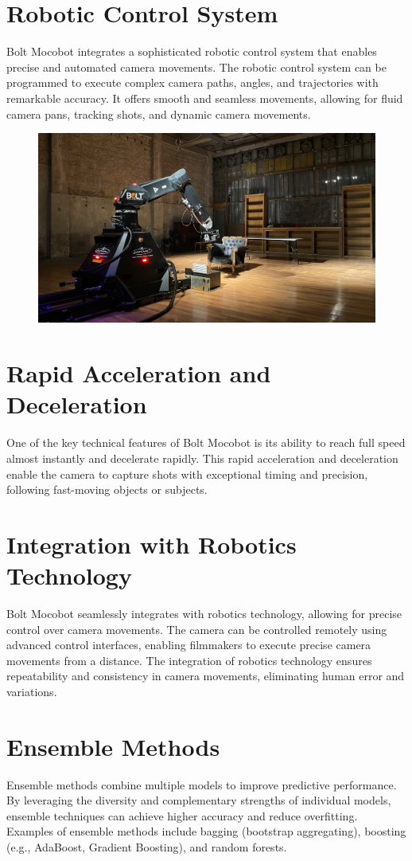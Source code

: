 \documentclass[a4paper,11pt]{report}
\begin{document}
\section{Robotic Control System}
Bolt Mocobot integrates a sophisticated robotic control system that enables precise and automated camera movements.
The robotic control system can be programmed to execute complex camera paths, angles, and trajectories with remarkable accuracy.
It offers smooth and seamless movements, allowing for fluid camera pans, tracking shots, and dynamic camera movements.
\begin{figure}[h]
	\centering
	\hspace{21pt}
	\includegraphics[width=.70\linewidth]{bolt1.jpeg}
	\label{fig:logo.png}
\end{figure}

\section{Rapid Acceleration and Deceleration}
One of the key technical features of Bolt Mocobot is its ability to reach full speed almost instantly and decelerate rapidly.
This rapid acceleration and deceleration enable the camera to capture shots with exceptional timing and precision, following fast-moving objects or subjects.

\section{Integration with Robotics Technology}
Bolt Mocobot seamlessly integrates with robotics technology, allowing for precise control over camera movements.
The camera can be controlled remotely using advanced control interfaces, enabling filmmakers to execute precise camera movements from a distance.
The integration of robotics technology ensures repeatability and consistency in camera movements, eliminating human error and variations.

\section{Ensemble Methods}
Ensemble methods combine multiple models to improve predictive performance. By leveraging the diversity and complementary strengths of individual models, ensemble techniques can achieve higher accuracy and reduce overfitting. Examples of ensemble methods include bagging (bootstrap aggregating), boosting (e.g., AdaBoost, Gradient Boosting), and random forests.
\end{document}
